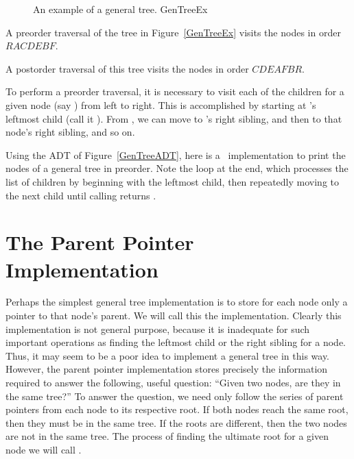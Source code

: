 \begin{figure}
\vspace{-\bigskipamount}

{An example of a general tree.}
{GenTreeEx}
\end{figure}

\begin{example}
A preorder traversal of the tree in Figure~\ref{GenTreeEx}
visits the nodes in order 
\(R A C D E B F\).

A postorder traversal of this tree visits the nodes in
order
\(C D E A F B R\).
\end{example}

To perform a preorder traversal, it is necessary to visit each of the
children for a given node (say ) from left to right.
This is accomplished by starting at 's leftmost child
(call it ).
From , we can move to 's right sibling, and then to
that node's right sibling, and so on.

Using the ADT of Figure~\ref{GenTreeADT}, here is a \Lang\
implementation to print the nodes of a general tree in
preorder.
Note the  loop at the end, which processes the list of
children by beginning with the leftmost child, then repeatedly moving
to the next child until calling \Cref{next} returns \NULL.


\newpage

\section{The Parent Pointer Implementation}
\label{ParentPointer}

Perhaps
the simplest general tree implementation is to store for each
node only a pointer to that node's parent.
We will call this the  implementation.
Clearly this implementation is not general purpose, because it is
inadequate for such important operations as finding
the leftmost child or the right sibling for a node.
Thus, it may seem to be a poor idea to implement a general
tree in this way.
However, the parent pointer implementation stores precisely the
information required to answer the following, useful question:
``Given two nodes, are they in the same tree?''
To answer the question, we need only follow the series of parent
pointers from each node to its respective root.
If both nodes reach the same root, then they must be in the same tree.
If the roots are different, then the two nodes are not in the same
tree.
The process of finding the ultimate root for a given node we will call
\defit{FIND}.

